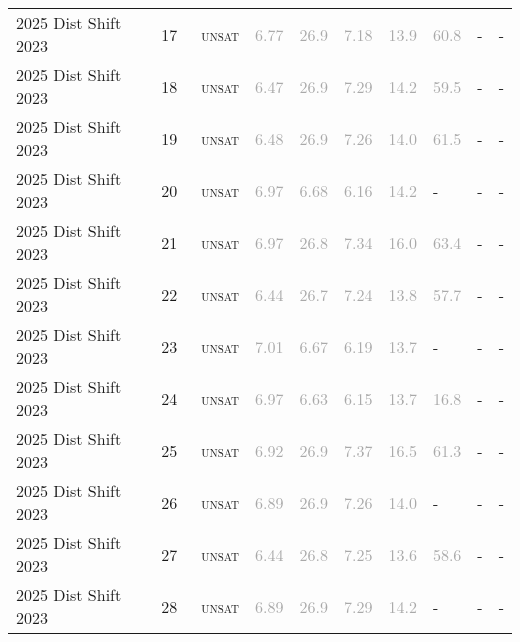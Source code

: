 \begin{center}
{\begin{longtable}{@{}llllllllll@{}}
2025 Dist Shift 2023 & 17 & ~\textsc{unsat} & \textcolor{darkgray}{6.77} & \textcolor{darkgray}{26.9} & \textcolor{darkgray}{7.18} & \textcolor{darkgray}{13.9} & \textcolor{darkgray}{60.8} & - & - \\
2025 Dist Shift 2023 & 18 & ~\textsc{unsat} & \textcolor{darkgray}{6.47} & \textcolor{darkgray}{26.9} & \textcolor{darkgray}{7.29} & \textcolor{darkgray}{14.2} & \textcolor{darkgray}{59.5} & - & - \\
2025 Dist Shift 2023 & 19 & ~\textsc{unsat} & \textcolor{darkgray}{6.48} & \textcolor{darkgray}{26.9} & \textcolor{darkgray}{7.26} & \textcolor{darkgray}{14.0} & \textcolor{darkgray}{61.5} & - & - \\
2025 Dist Shift 2023 & 20 & ~\textsc{unsat} & \textcolor{darkgray}{6.97} & \textcolor{darkgray}{6.68} & \textcolor{darkgray}{6.16} & \textcolor{darkgray}{14.2} & - & - & - \\
2025 Dist Shift 2023 & 21 & ~\textsc{unsat} & \textcolor{darkgray}{6.97} & \textcolor{darkgray}{26.8} & \textcolor{darkgray}{7.34} & \textcolor{darkgray}{16.0} & \textcolor{darkgray}{63.4} & - & - \\
2025 Dist Shift 2023 & 22 & ~\textsc{unsat} & \textcolor{darkgray}{6.44} & \textcolor{darkgray}{26.7} & \textcolor{darkgray}{7.24} & \textcolor{darkgray}{13.8} & \textcolor{darkgray}{57.7} & - & - \\
2025 Dist Shift 2023 & 23 & ~\textsc{unsat} & \textcolor{darkgray}{7.01} & \textcolor{darkgray}{6.67} & \textcolor{darkgray}{6.19} & \textcolor{darkgray}{13.7} & - & - & - \\
2025 Dist Shift 2023 & 24 & ~\textsc{unsat} & \textcolor{darkgray}{6.97} & \textcolor{darkgray}{6.63} & \textcolor{darkgray}{6.15} & \textcolor{darkgray}{13.7} & \textcolor{darkgray}{16.8} & - & - \\
2025 Dist Shift 2023 & 25 & ~\textsc{unsat} & \textcolor{darkgray}{6.92} & \textcolor{darkgray}{26.9} & \textcolor{darkgray}{7.37} & \textcolor{darkgray}{16.5} & \textcolor{darkgray}{61.3} & - & - \\
2025 Dist Shift 2023 & 26 & ~\textsc{unsat} & \textcolor{darkgray}{6.89} & \textcolor{darkgray}{26.9} & \textcolor{darkgray}{7.26} & \textcolor{darkgray}{14.0} & - & - & - \\
2025 Dist Shift 2023 & 27 & ~\textsc{unsat} & \textcolor{darkgray}{6.44} & \textcolor{darkgray}{26.8} & \textcolor{darkgray}{7.25} & \textcolor{darkgray}{13.6} & \textcolor{darkgray}{58.6} & - & - \\
2025 Dist Shift 2023 & 28 & ~\textsc{unsat} & \textcolor{darkgray}{6.89} & \textcolor{darkgray}{26.9} & \textcolor{darkgray}{7.29} & \textcolor{darkgray}{14.2} & - & - & - \\

\end{longtable}}
\end{center}
